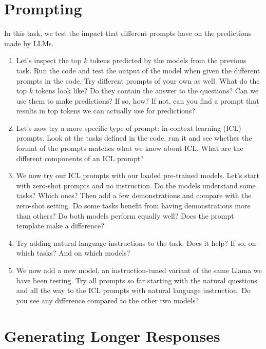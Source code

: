 \documentclass[11pt,a4paper]{article}
\begin{document}
\section{Prompting}

In this task, we test the impact that different prompts have on the predictions
made by LLMs.

\begin{enumerate}[label=(\alph*)]
    \item Let's inspect the top $k$ tokens predicted by the models from the
          previous task.
          Run the code and test the output of the model when given the different
          prompts in the code. Try different prompts of your own as well.
          What do the top $k$ tokens look like? Do they contain the answer to
          the questions? Can we use them to make predictions? If so, how? If
          not, can you find a prompt that results in top tokens we can actually
          use for predictions?
    \item Let's now try a more specific type of prompt: in-context learning
          (ICL) prompts. Look at the tasks defined in the code, run it and
          see whether the format of the prompts matches what we know about ICL.
          What are the different components of an ICL prompt?
    \item We now try our ICL prompts with our loaded pre-trained models.
          Let's start with zero-shot prompts and no instruction. Do the models
          understand some tasks? Which ones? Then add a few demonstrations and
          compare with the zero-shot setting. Do some tasks benefit from having
          demonstrations more than others? Do both models perform equally well?
          Does the prompt template make a difference?
    \item Try adding natural language instructions to the task. Does it help?
          If so, on which tasks? And on which models?
    \item We now add a new model, an instruction-tuned variant of the same Llama
          we have been testing. Try all prompts so far starting with the natural
          questions and all the way to the ICL prompts with natural language
          instruction. Do you see any difference compared to the other two
          models?
\end{enumerate}

\section{Generating Longer Responses}
\end{document}
